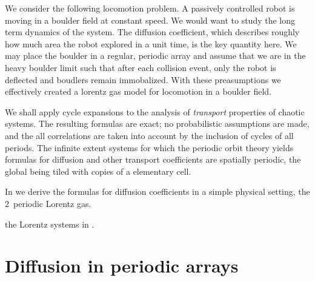 We consider the following locomotion problem. A passively controlled
robot is moving in a boulder field at constant speed. We would want to
study the long term dynamics of the system. The diffusion coefficient,
which describes roughly how much area the robot explored in a unit time,
is the key quantity here. We may place the boulder in a regular, periodic
array and assume that we are in the heavy boulder limit such that after
each collision event, only the robot is deflected and boudlers remain
immobalized. With these preasumptions we effectively created a lorentz
gas model for locomotion in a boulder field.

We shall apply cycle expansions to the analysis of {\em transport}
properties of chaotic systems. The resulting formulas are exact; no
probabilistic assumptions are made, and the all correlations are taken
into account by the inclusion of cycles of all periods.  The infinite
extent systems for which the periodic orbit theory yields formulas for
diffusion and other transport coefficients are spatially periodic, the
global {\statesp} being tiled with copies of a elementary cell.

In  we derive the formulas for diffusion
coefficients in a simple physical setting, the $2$\dmn\ periodic Lorentz
gas.

the Lorentz systems in .

\section{Diffusion in periodic arrays}
\label{s-DiffPerArr}

